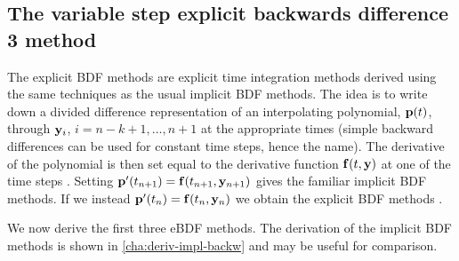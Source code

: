 \subsection{The variable step explicit backwards difference 3 method}

The explicit BDF methods are explicit time integration methods derived using the same techniques as the usual implicit BDF methods.
The idea is to write down a divided difference representation of an interpolating polynomial, ${\mathbf{p}}(t)$, through $\mathbf{y}_i$, $i=n-k+1, \ldots, n+1$ at the appropriate times (simple backward differences can be used for constant time steps, hence the name).
The derivative of the polynomial is then set equal to the derivative function ${\mathbf{f}{\left( t, \mathbf{y} \right)}}$ at one of the time steps \cite[400]{HairerNorsettWanner}.
Setting ${\mathbf{p}}'(t_{n+1}) = {\mathbf{f}{\left( t_{n+1}, \mathbf{y}_{n+1} \right)}}$ gives the familiar implicit BDF methods.
If we instead ${\mathbf{p}}'(t_{n}) = {\mathbf{f}{\left( t_{n}, \mathbf{y}_{n} \right)}}$ we obtain the explicit BDF methods \cite[364]{HairerNorsettWanner}.

We now derive the first three eBDF methods.
The derivation of the implicit BDF methods is shown in \cref{cha:deriv-impl-backw} and may be useful for comparison.

